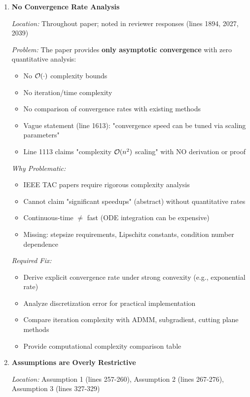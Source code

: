 \documentclass[journal,twoside,web]{ieeecolor}
\begin{document}
\begin{enumerate}
\item \textbf{No Convergence Rate Analysis}

\textit{Location:} Throughout paper; noted in reviewer responses (lines 1894, 2027, 2039)

\textit{Problem:} The paper provides \textbf{only asymptotic convergence} with zero quantitative analysis:

\begin{itemize}
\item No ${\cal O}(\cdot)$ complexity bounds
\item No iteration/time complexity
\item No comparison of convergence rates with existing methods
\item Vague statement (line 1613): "convergence speed can be tuned via scaling parameters"
\item Line 1113 claims "complexity ${\cal O}(n^2)$ scaling" with NO derivation or proof
\end{itemize}

\textit{Why Problematic:}
\begin{itemize}
\item IEEE TAC papers require rigorous complexity analysis
\item Cannot claim "significant speedups" (abstract) without quantitative rates
\item Continuous-time $\neq$ fast (ODE integration can be expensive)
\item Missing: stepsize requirements, Lipschitz constants, condition number dependence
\end{itemize}

\textit{Required Fix:}
\begin{itemize}
\item Derive explicit convergence rate under strong convexity (e.g., exponential rate)
\item Analyze discretization error for practical implementation
\item Compare iteration complexity with ADMM, subgradient, cutting plane methods
\item Provide computational complexity comparison table
\end{itemize}

\item \textbf{Assumptions are Overly Restrictive}

\textit{Location:} Assumption 1 (lines 257-260), Assumption 2 (lines 267-276), Assumption 3 (lines 327-329)


\end{enumerate}
\end{document}
